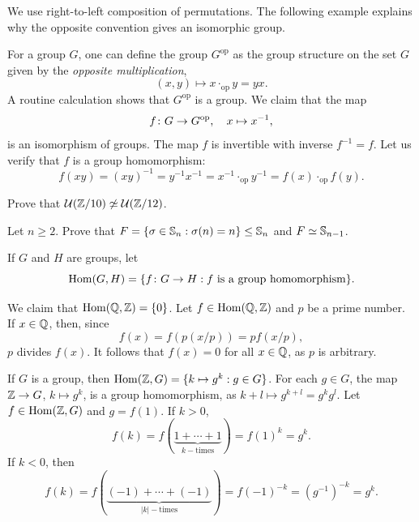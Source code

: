 We use right-to-left composition of permutations. The following example explains why the opposite convention gives an isomorphic group.


\begin{example}
\label{exa:op}
    For a group $G$, 
    one can define the group $G^{\operatorname{op}}$ as the group structure 
    on the set $G$ given by the \emph{opposite multiplication},  
    \[
    (x,y)\mapsto x\cdot_{\operatorname{op}}y=yx.
    \]
    A routine calculation shows that  
    $G^{\operatorname{op}}$ is a group. We claim that the map 
    \[
    f\colon G\to G^{\operatorname{op}},\quad x\mapsto x^{-1},
    \]
    is an isomorphism of groups. The map $f$ is invertible with inverse $f^{-1}=f$. 
    Let us verify that 
    $f$ is a group homomorphism:
    \[
    f(xy)=(xy)^{-1}=y^{-1}x^{-1}=x^{-1}\cdot_{\operatorname{op}}y^{-1}=f(x)\cdot_{\operatorname{op}}f(y).
    \]
\end{example}

\begin{exercise}
\label{xca:U(Z/10)}
   Prove that $\mathcal{U}(\mathbb{Z}/10)\not\simeq\mathcal{U}(\mathbb{Z}/12)$. 
\end{exercise}



\begin{exercise}
    Let $n\geq2$. 
Prove that $F=\{\sigma\in\mathbb{S}_n:\sigma(n)=n\}\leq\mathbb{S}_n$ and $F\simeq\mathbb{S}_{n-1}$.
\end{exercise}

If $G$ and $H$ are groups, let 
\[
\operatorname{Hom}(G,H)=\{f\colon G\to H:f\text{ is a group homomorphism}\}.
\]

\begin{example}
We claim that 
$\operatorname{Hom}(\mathbb{Q},\mathbb{Z})=\{0\}$. Let $f\in\operatorname{Hom}(\mathbb{Q},\mathbb{Z})$ and $p$ be a prime number. 
If $x\in\mathbb{Q}$, then, since 
\[
f(x)=f\left(p(x/p)\right)=pf(x/p),
\]
$p$ divides $f(x)$. It follows that $f(x)=0$ for all
$x\in\mathbb{Q}$, as $p$ is arbitrary. 
\end{example}

\begin{example}
If $G$ is a group, then $\operatorname{Hom}(\mathbb{Z},G)=\{k\mapsto g^k:g\in G\}$.
For each $g\in G$, the map $\mathbb{Z}\to G$, $k\mapsto g^k$, is a group
homomorphism, as 
$k+l\mapsto g^{k+l}=g^kg^l$. Let $f\in\operatorname{Hom}(\mathbb{Z},G)$ and  $g=f(1)$. If $k>0$,
\[
f(k)=f(\underbrace{1+\cdots+1}_{k-\text{times}})=f(1)^k=g^k.
\]
If $k<0$, then
\[
f(k)=f(\underbrace{(-1)+\cdots+(-1)}_{|k|-\text{times}})=f(-1)^{-k}=(g^{-1})^{-k}=g^k.
\]
\end{example}

